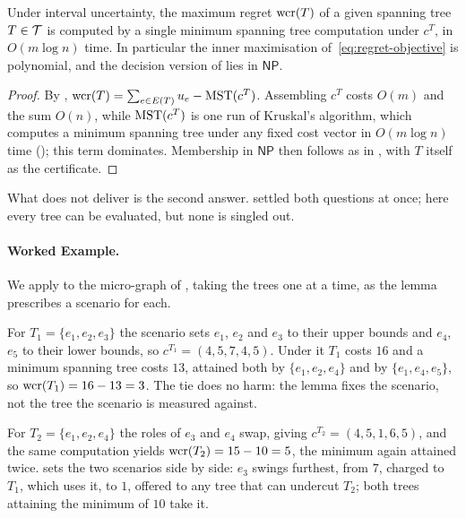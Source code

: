 \begin{corollary}\label{cor:regret-interval-evaluation}
Under interval uncertainty, the maximum regret $\mathrm{wcr}(T)$ of a given spanning tree $T \in \mathcal{T}$ is computed by a single minimum spanning tree computation under $c^{T}$, in $O(m \log n)$ time.
In particular the inner maximisation of~\eqref{eq:regret-objective} is polynomial, and the decision version of  lies in $\mathsf{NP}$.
\end{corollary}

\begin{proof}
By , $\mathrm{wcr}(T) = \sum_{e \in E(T)} u_e - \mathrm{MST}(c^{T})$.
Assembling $c^{T}$ costs $O(m)$ and the sum $O(n)$, while $\mathrm{MST}(c^{T})$ is one run of Kruskal's algorithm, which computes a minimum spanning tree under any fixed cost vector in $O(m \log n)$ time (); this term dominates.
Membership in $\mathsf{NP}$ then follows as in , with $T$ itself as the certificate.
\end{proof}

What  does not deliver is the second answer.
 settled both questions at once; here every tree can be evaluated, but none is singled out.

\paragraph{Worked Example.}

We apply  to the micro-graph of , taking the trees one at a time, as the lemma prescribes a scenario for each.

For $T_1 = \{e_1, e_2, e_3\}$ the scenario sets $e_1$, $e_2$ and $e_3$ to their upper bounds and $e_4$, $e_5$ to their lower bounds, so $c^{T_1} = (4, 5, 7, 4, 5)$.
Under it $T_1$ costs $16$ and a minimum spanning tree costs $13$, attained both by $\{e_1, e_2, e_4\}$ and by $\{e_1, e_4, e_5\}$, so $\mathrm{wcr}(T_1) = 16 - 13 = 3$.
The tie does no harm: the lemma fixes the scenario, not the tree the scenario is measured against.

For $T_2 = \{e_1, e_2, e_4\}$ the roles of $e_3$ and $e_4$ swap, giving $c^{T_2} = (4, 5, 1, 6, 5)$, and the same computation yields $\mathrm{wcr}(T_2) = 15 - 10 = 5$, the minimum again attained twice.
 sets the two scenarios side by side: $e_3$ swings furthest, from $7$, charged to $T_1$, which uses it, to $1$, offered to any tree that can undercut $T_2$; both trees attaining the minimum of $10$ take it.

